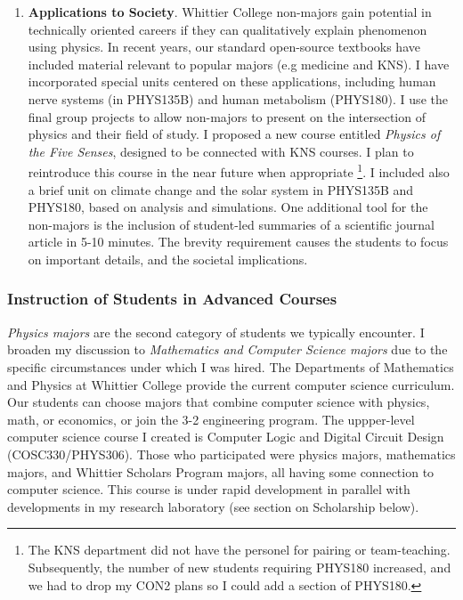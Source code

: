 \documentclass[../../main.tex]{subfiles}
\begin{document}
\begin{enumerate}
\item \textbf{Applications to Society}. Whittier College non-majors gain potential in technically oriented careers if they can qualitatively explain phenomenon using physics.  In recent years, our standard open-source textbooks have included material relevant to popular majors (e.g medicine and KNS). I have incorporated special units centered on these applications, including human nerve systems (in PHYS135B) and human metabolism (PHYS180).  I use the final group projects to allow non-majors to present on the intersection of physics and their field of study.  I proposed a new course entitled \textit{Physics of the Five Senses}, designed to be connected with KNS courses.  I plan to reintroduce this course in the near future when appropriate \footnote{The KNS department did not have the personel for pairing or team-teaching.  Subsequently, the number of new students requiring PHYS180 increased, and we had to drop my CON2 plans so I could add a section of PHYS180.}. I included also a brief unit on climate change and the solar system in PHYS135B and PHYS180, based on analysis and simulations.  One additional tool for the non-majors is the inclusion of student-led summaries of a scientific journal article in 5-10 minutes.  The brevity requirement causes the students to focus on important details, and the societal implications.
\end{enumerate}

\subsubsection{Instruction of Students in Advanced Courses}

\label{sec:teaching_phil2}

\textit{Physics majors} are the second category of students we typically encounter.  I broaden my discussion to \textit{Mathematics and Computer Science majors} due to the specific circumstances under which I was hired.  The Departments of Mathematics and Physics at Whittier College provide the current computer science curriculum.  Our students can choose majors that combine computer science with physics, math, or economics, or join the 3-2 engineering program.  The uppper-level computer science course I created is Computer Logic and Digital Circuit Design (COSC330/PHYS306).  Those who participated were physics majors, mathematics majors, and Whittier Scholars Program majors, all having some connection to computer science.  This course is under rapid development in parallel with developments in my research laboratory (see section on Scholarship below). \\ \hspace{0.1cm}
\end{document}
